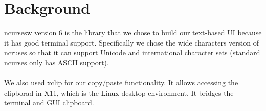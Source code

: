 \section{Background}\label{sec:bg}

ncursesw version 6 \cite{ncursesw} is the library that we chose to build our text-based UI because it has good terminal support. Specifically we chose the wide characters version of ncruses so that it can support Unicode and international character sets (standard ncurses only has ASCII support).
\\\\We also used xclip \cite{xclip} for our copy/paste functionality. It allows accessing the clipborad in X11, which is the Linux desktop environment. It bridges the terminal and GUI clipboard.